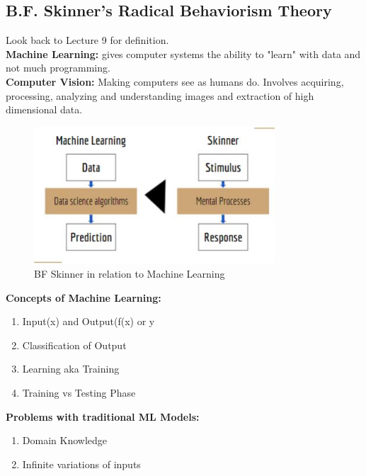 \documentclass{article}
\begin{document}
\subsection{B.F. Skinner's Radical Behaviorism Theory}
Look back to Lecture 9 for definition. \\
\textbf{Machine Learning:} gives computer systems the ability to "learn" with data and not much programming. \\
\textbf{Computer Vision:} Making computers see as humans do. Involves acquiring, processing, analyzing and understanding images and extraction of high dimensional data. \\
\begin{figure}[htp]
\centering
\includegraphics[width=9cm]{images/machinelearning.JPG}
\caption{BF Skinner in relation to Machine Learning}
\label{fig: ML and Skinner}
\end{figure}

\noindent \textbf{Concepts of Machine Learning:} 
\begin{enumerate}
    \item Input(x) and Output(f(x) or y
    \item Classification of Output
    \item Learning aka Training
    \item Training vs Testing Phase
\end{enumerate}

\noindent \textbf{Problems with traditional ML Models:}
\begin{enumerate}
    \item Domain Knowledge
    \item Infinite variations of inputs
\end{enumerate}
\end{document}
